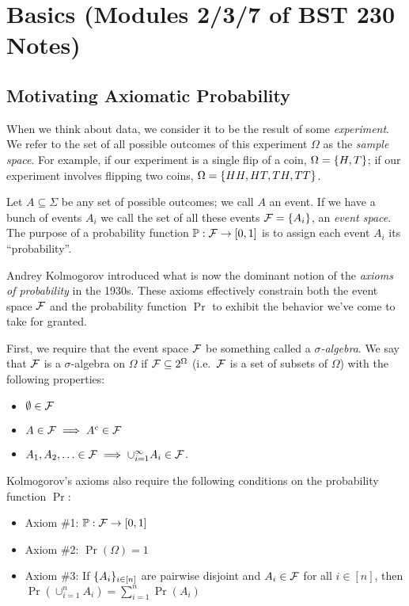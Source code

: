 \section{Basics (Modules 2/3/7 of BST 230 Notes)}

\subsection{Motivating Axiomatic Probability}

When we think about data, we consider it to be the result of some \emph{experiment}.
We refer to the set of all possible outcomes of this experiment $\Omega$ as the \emph{sample space}.
For example, if our experiment is a single flip of a coin, 
$\Omega = \{H, T\}$; if our experiment involves flipping two coins,
$\Omega = \{HH, HT, TH, TT\}$.

Let $A \subseteq \Sigma$ be any set of possible outcomes; we call
$A$ an event. If we have a bunch of events $A_i$ we call the 
set of all these events $\mathcal F = \{A_i\}$, an \emph{event space}.
The purpose of a probability function $\operatorname*{\mathbb{P}}: \mathcal F \rightarrow [0,1]$
is to assign each event $A_i$ its ``probability''.

Andrey Kolmogorov introduced what is now the dominant notion of the 
\emph{axioms of probability} in the 1930s. These axioms effectively constrain
both the event space $\mathcal F$ and the probability function $\Pr$ to exhibit the behavior we've come to 
take for granted.

First, we require that the event space $\mathcal F$ be something called a \emph{$\sigma$-algebra}.
We say that $\mathcal F$ is a $\sigma$-algebra on $\Omega$ if $\mathcal F \subseteq 2^{\Omega}$ 
(i.e.\ $\mathcal F$ is a set of subsets of $\Omega$) with the following properties:

\begin{itemize}
    \item $\emptyset \in \mathcal F$
    \item $A \in \mathcal F \implies A^c \in \mathcal F$
    \item $A_1, A_2, \hdots \in \mathcal F \implies \cup_{i=1}^{\infty} A_i \in \mathcal F$.
\end{itemize}

Kolmogorov's axioms also require the following conditions on the 
probability function $\Pr$:

\begin{itemize}
    \item Axiom \#1: $\operatorname*{\mathbb{P}}: \mathcal F \rightarrow [0,1]$
    \item Axiom \#2: $\Pr(\Omega) = 1$
    \item Axiom \#3: If $\{A_i\}_{i \in [n]}$ are pairwise disjoint and 
                     $A_i \in \mathcal F$ for all $i \in [n]$, then 
                     $\Pr \left( \cup_{i=1}^{n} A_i \right) = \sum_{i=1}^{n} \Pr(A_i)$
\end{itemize}

